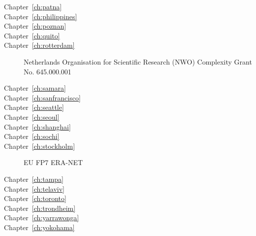\begin{description}
\item[Chapter~\ref{ch:patna}]  

\item[Chapter~\ref{ch:philippines}]  

\item[Chapter~\ref{ch:poznan}]  

\item[Chapter~\ref{ch:quito}]  

\item[Chapter~\ref{ch:rotterdam}]  Netherlands Organisation for Scientific Research (NWO) Complexity Grant No. 645.000.001

\item[Chapter~\ref{ch:samara}]  

\item[Chapter~\ref{ch:sanfrancisco}]  

\item[Chapter~\ref{ch:seattle}]  

\item[Chapter~\ref{ch:seoul}]  

\item[Chapter~\ref{ch:shanghai}]  

\item[Chapter~\ref{ch:sochi}]  

\item[Chapter~\ref{ch:stockholm}]  EU FP7 ERA-NET 

\item[Chapter~\ref{ch:tampa}]  

\item[Chapter~\ref{ch:telaviv}]  

\item[Chapter~\ref{ch:toronto}]  

\item[Chapter~\ref{ch:trondheim}]  

\item[Chapter~\ref{ch:yarrawonga}]  

\item[Chapter~\ref{ch:yokohama}]  
%
%
\end{description}

